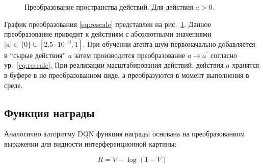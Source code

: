 \begin{figure}[ht]
\caption{Преобразование пространства действий. Для действия $a > 0$.}
\label{fig:rescale}
\end{figure}

График преобразования \eqref{eq:rescale} представлен на рис.~\ref{fig:rescale}. Данное преобразование приводит к действиям с абсолютными значениями $|a|\in\{0\}\cup[2.5 \cdot 10^{-3}, 1]$. При обучении агента шум первоначально добавляется в ``сырые действия'' $a$ затем производится преобразование $a \to a^{\prime}$ согласно ур.~\eqref{eq:rescale}. При реализации масштабирования действий, действия $a$ хранятся в буфере в не преобразованном виде, а преобразуются в момент выполнения в среде. 

\subsection{Функция награды}

Аналогично алгоритму DQN функция награды основана на преобразованном выражении для видности интерференционной картины:

\begin{equation}
    R = V - \log(1-V)  
\label{eq:td3_reward}
\end{equation}


